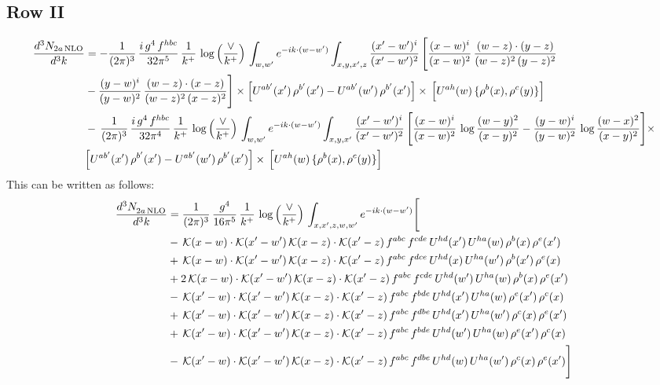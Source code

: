 \documentclass[9pt]{article}
\numberwithin{equation}{section}
\begin{document}
\subsection{Row II}
\begin{align}
\frac{d^{3}N_{2a\,\rm NLO}}{d^{3}k} & =  -\frac{1}{(2\pi)^{3}}\,\frac{i\,g^{4}\,f^{hbc}}{32\pi^{5}}\,\frac{1}{k^{+}}\,\log{\left(\frac{\vee}{k^{+}}\right)}\,
\int_{w,w'} e^{-ik\cdot (w-w')}\int_{x,y,x',z}\frac{(x'-w')^{i}}{(x'-w')^{2}}\,\Bigg[\frac{(x-w)^{i}}{(x-w)^{2}}\, \frac{(w-z)\cdot (y-z)}{(w-z)^{2}\,(y-z)^{2}}\notag \\ & - \frac{(y-w)^{i}}{(y-w)^{2}}\, \frac{(w-z)\cdot (x-z)}{(w-z)^{2}\,(x-z)^{2}}\Bigg]\times\Big[U^{ab'}(x')\,\rho^{b'}(x')-U^{ab'}(w')\,\rho^{b'}(x')\Big]\times\, \Big[U^{ah}(w)\,\{\rho^{b}(x),\rho^{c}(y)\}\Big] \notag \\
& -\,\frac{1}{(2\pi)^{3}}\,\frac{i\,g^{4}\,f^{hbc}}{32\pi^{4}}\,\frac{1}{k^{+}}\,\log{\left(\frac{\vee}{k^{+}}\right)}\,
\int_{w,w'} e^{-ik\cdot (w-w')}\int_{x,y,x'}\frac{(x'-w')^{i}}{(x'-w')^{2}}\,\Bigg[\frac{(x-w)^{i}}{(x-w)^{2}}\,\log\frac{(w-y)^{2}}{(x-y)^{2}}-\frac{(y-w)^{i}}{(y-w)^{2}}\,\log\frac{(w-x)^{2}}{(x-y)^{2}}\Bigg]\times\notag \\ & \Big[U^{ab'}(x')\,\rho^{b'}(x')-U^{ab'}(w')\,\rho^{b'}(x')\Big]\times\, \Big[U^{ah}(w)\,\{\rho^{b}(x),\rho^{c}(y)\}\Big]
\end{align}
This can be written as follows: 
\begin{align}
\frac{d^{3}N_{2a\,\rm NLO}^{\rm}}{d^{3}k}  & = \frac{1}{(2\pi)^{3}}\,\frac{g^{4}}{16\pi^{5}}\,\frac{1}{k^{+}}\,\log{\left(\frac{\vee}{k^{+}}\right)}\, \int_{x,x',z,w,w'}e^{-ik\cdot (w-w')}\Bigg[\notag\\
&-\,\mathcal{K}(x-w)\cdot\mathcal{K}(x'-w')\,\mathcal{K}(x-z)\cdot\mathcal{K}(x'-z)\,f^{abc}\,f^{cde}\,U^{hd}(x')\,U^{ha}(w)\,\rho^{b}(x)\,\rho^{e}(x')\notag\\
&+\,\mathcal{K}(x-w)\cdot\mathcal{K}(x'-w')\,\mathcal{K}(x-z)\cdot\mathcal{K}(x'-z)\,f^{abc}\,f^{dce}\,U^{hd}(x)\,U^{ha}(w')\,\rho^{b}(x')\,\rho^{e}(x)\notag\\
&+2\,\mathcal{K}(x-w)\cdot\mathcal{K}(x'-w')\,\mathcal{K}(x-z)\cdot\mathcal{K}(x'-z)\,f^{abc}\,f^{cde}\,U^{hd}(w')\,U^{ha}(w)\,\rho^{b}(x)\,\rho^{e}(x')\notag\\
&-\,\mathcal{K}(x'-w)\cdot\mathcal{K}(x'-w')\,\mathcal{K}(x-z)\cdot\mathcal{K}(x'-z)\,f^{abc}\,f^{bde}\,U^{hd}(x')\,U^{ha}(w)\,\rho^{e}(x')\,\rho^{c}(x)\notag\\
&+\,\mathcal{K}(x'-w)\cdot\mathcal{K}(x'-w')\,\mathcal{K}(x-z)\cdot\mathcal{K}(x'-z)\,f^{abc}\,f^{dbe}\,U^{hd}(x')\,U^{ha}(w')\,\rho^{c}(x)\,\rho^{e}(x')\notag\\
&+\,\mathcal{K}(x'-w)\cdot\mathcal{K}(x'-w')\,\mathcal{K}(x-z)\cdot\mathcal{K}(x'-z)\,f^{abc}\,f^{bde}\,U^{hd}(w')\,U^{ha}(w)\,\rho^{e}(x')\,\rho^{c}(x)\notag\\
&-\,\mathcal{K}(x'-w)\cdot\mathcal{K}(x'-w')\,\mathcal{K}(x-z)\cdot\mathcal{K}(x'-z)\,f^{abc}\,f^{dbe}\,U^{hd}(w)\,U^{ha}(w')\,\rho^{c}(x)\,\rho^{e}(x')\Bigg]
\end{align}
\end{document}
